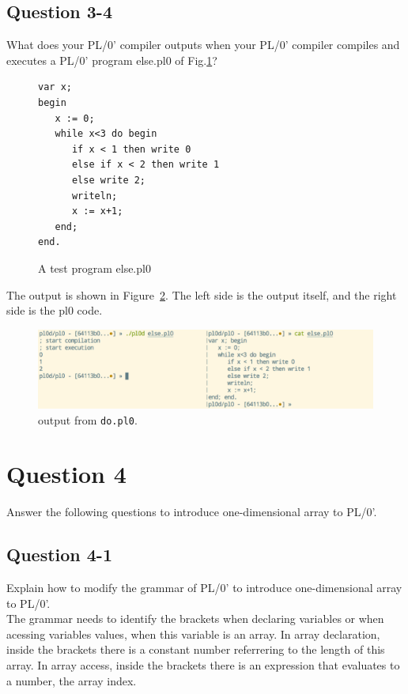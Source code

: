 \documentclass{article}
\begin{document}
\subsection*{Question 3-4}
What does your PL/0' compiler outputs when your PL/0' compiler compiles
and executes a PL/0' program else.pl0 of Fig.\ref{fig:if-then-else}?

\begin{figure}[h]
\begin{verbatim}
var x;
begin
   x := 0;
   while x<3 do begin
      if x < 1 then write 0
      else if x < 2 then write 1
      else write 2;
      writeln;
      x := x+1;
   end;
end.
\end{verbatim}
\caption{A test program else.pl0}\label{fig:if-then-else}
\end{figure}


\ifreport
The output is shown in Figure~\ref{fig:q34}. The left side is the output itself, and the right side is the pl0 code. \\
\begin{figure}[h]
  \includegraphics[scale=0.35]{./img/Q3-4.png}
  \centering
  \caption{output from {\tt do.pl0}.}
  \label{fig:q34}
\end{figure}
\fi


\newpage
\section*{Question 4}
Answer the following questions to introduce one-dimensional array to PL/0'.


\subsection*{Question 4-1}
Explain how to modify the grammar of PL/0' to introduce one-dimensional array to PL/0'.\\[0.3cm]

\ifreport
The grammar needs to identify the brackets when declaring variables or when acessing variables values, when this variable is an array. In array declaration, inside the brackets there is a constant number referrering to the length of this array. In array access, inside the brackets there is an expression that evaluates to a number, the array index.\\[0.3cm]
\fi
\end{document}
